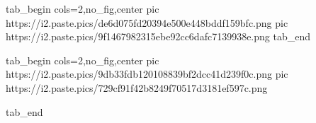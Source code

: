  
 
 
 
 
\zzSecCmtScr

\ifcmt
  tab_begin cols=2,no_fig,center
     pic https://i2.paste.pics/de6d075fd20394e500e448bddf159bfc.png
     pic https://i2.paste.pics/9f1467982315ebe92cc6dafc7139938e.png
  tab_end
\fi

\ifcmt
  tab_begin cols=2,no_fig,center
		pic https://i2.paste.pics/9db33fdb120108839bf2dcc41d239f0c.png
		pic https://i2.paste.pics/729cf91f42b8249f70517d3181ef597c.png

  tab_end
\fi
